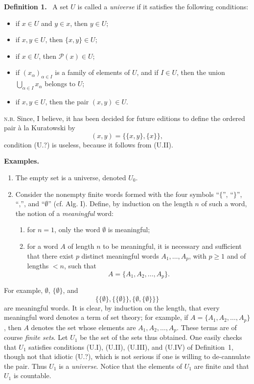 \documentclass[11pt]{article}
\newcommand{\Pset}{\mathcal{P}}
\newcommand{\cf}{cf.}
\newcommand{\NB}{\textsc{n.b.}}
\newenvironment{statement}[1]{\par\medskip\noindent\textbf{#1.}\ }{\par\medskip}
\newenvironment{remarktext}[1]{\par\medskip\noindent\textbf{#1.}\ }{\par\medskip}
\begin{document}
\begin{statement}{Definition 1}
A set \(U\) is called a \emph{universe} if it satisfies the following conditions:
\begin{itemize}[leftmargin=3em]
\item[(U.I)] if \(x\in U\) and \(y\in x\), then \(y\in U\);
\item[(U.II)] if \(x,y\in U\), then \(\{x,y\}\in U\);
\item[(U.III)] if \(x\in U\), then \(\Pset(x)\in U\);
\item[(U.IV)] if \((x_\alpha)_{\alpha\in I}\) is a family of elements of \(U\), and if \(I\in U\), then the union \(\bigcup_{\alpha\in I}x_\alpha\) belongs to \(U\);
\item[(U.?)] if \(x,y\in U\), then the pair \((x,y)\in U\).
\end{itemize}
\end{statement}

\noindent\NB{} Since, I believe, it has been decided for future editions to define the ordered pair \`a la Kuratowski by
\[
 (x,y)=\{\{x,y\},\{x\}\},
\]
condition (U.?) is useless, because it follows from (U.II).

\begin{remarktext}{Examples}
\begin{enumerate}[label=\arabic*)]
\item The empty set is a universe, denoted \(U_0\).
\item Consider the nonempty finite words formed with the four symbols ``\(\{\)'', ``\(\}\)'', ``,'', and ``\(\emptyset\)'' (\cf{} Alg. I). Define, by induction on the length \(n\) of such a word, the notion of a \emph{meaningful} word:
\begin{enumerate}[label=(\alph*)]
\item for \(n=1\), only the word \(\emptyset\) is meaningful;
\item for a word \(A\) of length \(n\) to be meaningful, it is necessary and sufficient that there exist \(p\) distinct meaningful words \(A_1,\ldots,A_p\), with \(p\geq 1\) and of lengths \(<n\), such that
\[
 A=\{A_1,A_2,\ldots,A_p\}.
\]
\end{enumerate}
\end{enumerate}
\end{remarktext}

For example, \(\emptyset\), \(\{\emptyset\}\), and
\[
 \{\{\emptyset\},\{\{\emptyset\}\},\{\emptyset,\{\emptyset\}\}\}
\]
are meaningful words. It is clear, by induction on the length, that every meaningful word denotes a term of set theory; for example, if \(A=\{A_1,A_2,\ldots,A_p\}\), then \(A\) denotes the set whose elements are \(A_1,A_2,\ldots,A_p\). These terms are of course \emph{finite sets}. Let \(U_1\) be the set of the sets thus obtained. One easily checks that \(U_1\) satisfies conditions (U.I), (U.II), (U.III), and (U.IV) of Definition~1, though not that idiotic (U.?), which is not serious if one is willing to de-cannulate the pair. Thus \(U_1\) is a \emph{universe}. Notice that the elements of \(U_1\) are finite and that \(U_1\) is countable.
\end{document}
